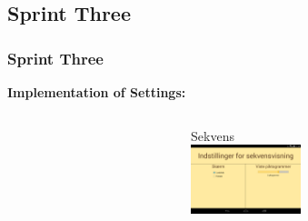 \subsection{Sprint Three}
\begin{frame}
\frametitle{Sprint Three}
\begin{center}
\textbf{Implementation of Settings:}
\end{center}
\begin{columns}
\begin{column}{0.5\textwidth}

          \begin{center}
        \end{center}
        \begin{center}
        \end{center}
\end{column}
\begin{column}{0.5\textwidth}
        \begin{center}
         \end{center}
        \begin{center}
                     {Sekvens\\
                     \includegraphics[height=2cm]{../report/figures/pres/settingssekvens}}
        \end{center}
\end{column}
\end{columns}
\end{frame}

